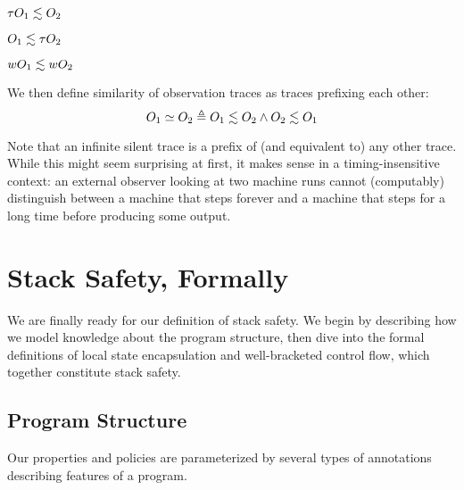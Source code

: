 \documentclass[acmsmall,review,anonymous]{acmart}\settopmatter{printfolios=true,printccs=false,printacmref=false}
\begin{document}
{\begin{minipage}{.3\textwidth}
         {\(\tau O_1 \lesssim O_2\)}
\end{minipage}
\begin{minipage}{.3\textwidth}
         {\(O_1 \lesssim \tau O_2\)}
\end{minipage}
\begin{minipage}{.3\textwidth}
         {\(wO_1 \lesssim wO_2\)}
\end{minipage}

\smallskip
We then define similarity of observation traces as traces prefixing each other:
\[O_1 \simeq O_2 \triangleq O_1 \lesssim O_2 \land O_2 \lesssim O_1\]
%

Note that an infinite silent trace is a
prefix of (and equivalent to) any other trace. While this might seem
surprising at first, it makes sense in a timing-insensitive context:
an external observer looking at two machine runs cannot (computably)
distinguish between a machine that steps forever and a machine that
steps for a long time before producing some output.

\section{Stack Safety, Formally}
\label{sec:lse-and-wbcf}

We are finally ready for our definition of stack safety. We begin
by describing how we model knowledge about the program structure,
then dive into the formal definitions of local state encapsulation and
well-bracketed control flow, which together constitute stack safety.

\subsection{Program Structure}

Our properties and policies are parameterized by several types of
annotations describing features of a program.

}
\end{document}
